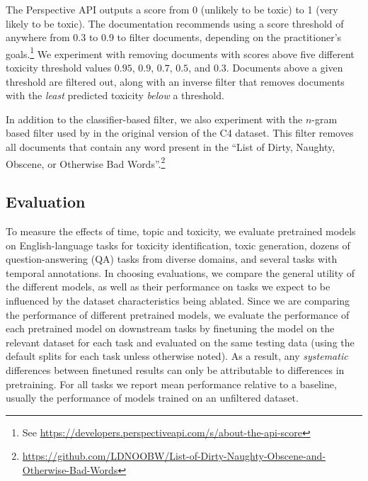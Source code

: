 \documentclass{article}
\begin{document}
The Perspective API outputs a score from 0 (unlikely to be toxic) to 1 (very likely to be toxic).
The documentation recommends using a score threshold of anywhere from 0.3 to 0.9 to filter documents, depending on the practitioner's goals.\footnote{See \url{https://developers.perspectiveapi.com/s/about-the-api-score}}
We experiment with removing documents with scores above five different toxicity threshold values $0.95$, $0.9$, $0.7$, $0.5$, and $0.3$. Documents above a given threshold are filtered out, along with an inverse filter that removes documents with the \textit{least} predicted toxicity \textit{below} a threshold.

In addition to the classifier-based filter, we also experiment with the $n$-gram based filter used by \citet{raffel2020exploring} in the original version of the C4 dataset.
This filter removes all documents that contain any word present in the ``List of Dirty, Naughty, Obscene, or Otherwise Bad Words''.\footnote{\url{https://github.com/LDNOOBW/List-of-Dirty-Naughty-Obscene-and-Otherwise-Bad-Words}}


\vspace{-3mm}
\subsection{Evaluation}
\label{sec:finetune-eval}

To measure the effects of time, topic and toxicity, we evaluate pretrained models on English-language tasks for toxicity identification, toxic generation, dozens of question-answering (QA) tasks from diverse domains, and several tasks with temporal annotations.
In choosing evaluations, we compare the general utility of the different models, as well as their performance on tasks we expect to be influenced by the dataset characteristics being ablated.
Since we are comparing the performance of different pretrained models, we evaluate the performance of each pretrained model on downstream tasks by finetuning the model on the relevant dataset for each task
and evaluated on the same testing data (using the default splits for each task unless otherwise noted).
As a result, any \emph{systematic} differences between finetuned results can only be attributable to differences in pretraining.
For all tasks we report mean performance relative to a baseline, usually the performance of models trained on an unfiltered dataset.
\end{document}
